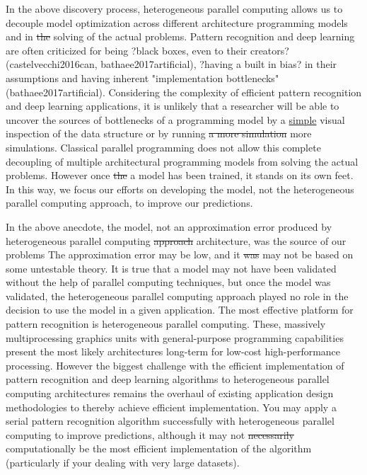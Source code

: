 \documentclass[10pt]{article}[draft]
\begin{document}
In the above discovery process, heterogeneous parallel computing allows us to decouple model optimization across different architecture programming models and  in \st{the} solving of the actual problems. Pattern recognition and deep learning are often criticized for being  ?black boxes, even to their creators? (castelvecchi2016can, bathaee2017artificial), ?having a built in bias? in their assumptions and having inherent "implementation bottlenecks" (bathaee2017artificial). Considering the complexity of efficient pattern recognition and deep learning applications, it is unlikely that a researcher will be able to uncover the sources of bottlenecks of a programming model by a \underline{simple} visual inspection of the data structure  or by running \st{a more simulation} more simulations. Classical parallel programming does not allow this complete decoupling of multiple architectural programming models from  solving the actual problems. However once \st{the} a model has been trained, it stands on its own feet. In this way, we focus our efforts on developing the model, not the  heterogeneous parallel computing approach, to improve our  predictions. 
	
In the above anecdote, the model, not an approximation error produced by  heterogeneous parallel computing \st{approach} architecture, was the source of our problems The approximation error may be low, and it \st{was} may not be based on some untestable theory. It is true that a model may not have been validated without the help of parallel computing techniques, but once the model was validated, the heterogeneous parallel computing approach  played no role in the decision to use the model in a given application. The most effective platform for pattern recognition is  heterogeneous parallel computing. These, massively multiprocessing graphics units with general-purpose programming capabilities present the most likely architectures long-term for low-cost high-performance processing. However the biggest challenge with the efficient implementation of pattern recognition and deep learning algorithms to heterogeneous parallel computing architectures remains the overhaul of existing application design methodologies to thereby achieve  efficient implementation. You may apply a serial pattern recognition algorithm successfully with  heterogeneous parallel computing to improve predictions, although it may not \st{necessarily} computationally be the most efficient implementation  of the algorithm (particularly if your dealing with very large datasets). 
\end{document}
